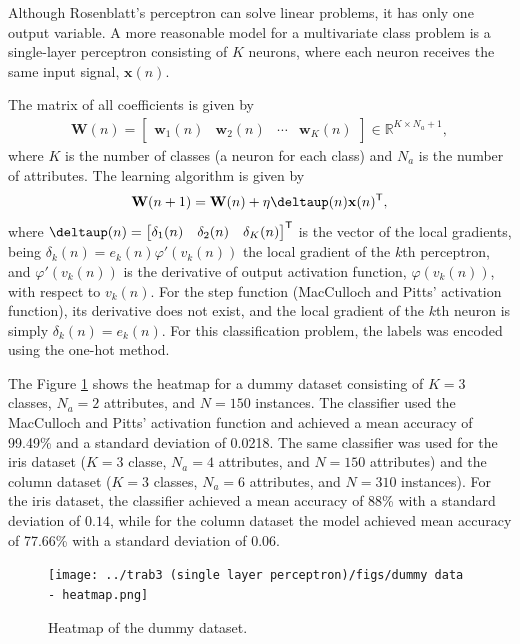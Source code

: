 \documentclass[12pt,a4paper]{article}
\newcommand{\trans}{\mathsf{T}}
\newcommand{\Real}{\mathbb{R}}
\begin{document}
Although Rosenblatt's perceptron can solve linear problems, it has only one output variable. A more reasonable model for a multivariate class problem is a single-layer perceptron consisting of \(K\) neurons, where each neuron receives the same input signal, \(\mathbf{x}(n)\).

The matrix of all coefficients is given by
\begin{align}
    \mathbf{W}(n) = \begin{bmatrix}
        \mathbf{w}_1 (n) & \mathbf{w}_2 (n) & \cdots & \mathbf{w}_K (n)
    \end{bmatrix} \in \Real^{K \times N_a+1},
\end{align}
where \(K\) is the number of classes (a neuron for each class) and \(N_a\) is the number of attributes. The learning algorithm is given by
\begin{align}
    \mathbf{W}(n+1) = \mathbf{W}(n) + \eta \boldsymbol{\deltaup}(n) \mathbf{x}(n)^\trans,
\end{align}
where \(\boldsymbol{\deltaup}(n) = \begin{bmatrix}
    \delta_1(n) & \delta_2(n) & \delta_K(n)
\end{bmatrix}^\trans\) is the vector of the local gradients, being \(\delta_k(n) = e_k (n) \varphi'(v_k (n))\) the local gradient of the \(k\)th perceptron, and \(\varphi'(v_k (n))\) is the derivative of output activation function, \(\varphi(v_k (n))\), with respect to \(v_k (n)\). For the step function (MacCulloch and Pitts' activation function), its derivative does not exist, and the local gradient of the \(k\)th neuron is simply \(\delta_k(n) = e_k (n)\). For this classification problem, the labels was encoded using the one-hot method.

The Figure \ref{fig:heatmap-dummy-dataset} shows the heatmap for a dummy dataset consisting of \(K=3\) classes, \(N_a=2\) attributes, and \(N=150\) instances. The classifier used the MacCulloch and Pitts' activation function and achieved a mean accuracy of 99.49\% and a standard deviation of 0.0218. The same classifier was used for the iris dataset (\(K=3\) classe, \(N_a=4\) attributes, and \(N=150\) attributes) and the column dataset (\(K=3\) classes, \(N_a=6\) attributes, and \(N=310\) instances). For the iris dataset, the classifier achieved a mean accuracy of 88\% with a standard deviation of \(0.14\), while for the column dataset the model achieved mean accuracy of 77.66\% with a standard deviation of \(0.06\).

\begin{figure}[H]
    \centering
    \texttt{[image: ../trab3 (single layer perceptron)/figs/dummy data - heatmap.png]}
    \caption{Heatmap of the dummy dataset.}
    \label{fig:heatmap-dummy-dataset}
\end{figure}
\end{document}

